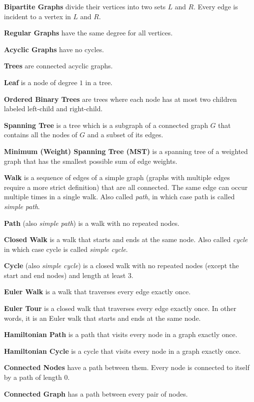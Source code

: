 \documentclass[../main.tex]{subfiles}
\begin{document}
\textbf{Bipartite Graphs} divide their vertices into two sets $L$ and $R$. Every edge is incident to a vertex in $L$ and $R$.

\textbf{Regular Graphs} have the same degree for all vertices.

\textbf{Acyclic Graphs} have no cycles.

\textbf{Trees} are connected acyclic graphs.

\textbf{Leaf} is a node of degree $1$ in a tree.

\textbf{Ordered Binary Trees} are trees where each node has at most two children labeled left-child and right-child.

\textbf{Spanning Tree} is a tree which is a subgraph of a connected graph $G$ that contains all the nodes of $G$ and a subset of its edges.

\textbf{Minimum (Weight) Spanning Tree (MST)} is a spanning tree of a weighted graph that has the smallest possible sum of edge weights.

\textbf{Walk} is a sequence of edges of a simple graph (graphs with multiple edges require a more strict definition) that are all connected. The same edge can occur multiple times in a single walk. Also called \textit{path}, in which case path is called \textit{simple path}.

\textbf{Path} (also \textit{simple path}) is a walk with no repeated nodes.

\textbf{Closed Walk} is a walk that starts and ends at the same node. Also called \textit{cycle} in which case cycle is called \textit{simple cycle}.

\textbf{Cycle} (also \textit{simple cycle}) is a closed walk with no repeated nodes (except the start and end nodes) and length at least $3$.

\textbf{Euler Walk} is a walk that traverses every edge exactly once.

\textbf{Euler Tour} is a closed walk that traverses every edge exactly once. In other words, it is an Euler walk that starts and ends at the same node.

\textbf{Hamiltonian Path} is a path that visits every node in a graph exactly once.

\textbf{Hamiltonian Cycle} is a cycle that visits every node in a graph exactly once.

\textbf{Connected Nodes} have a path between them. Every node is connected to itself by a path of length $0$.

\textbf{Connected Graph} has a path between every pair of nodes.
\end{document}
